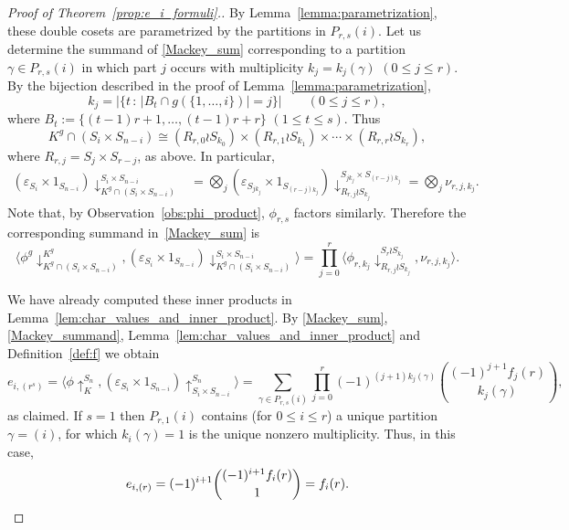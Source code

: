 \documentclass[10pt]{article}
\theoremstyle{definition}
\newcommand{\card}[1]{\ensuremath{\left|#1\right|}}
\begin{document}
\begin{proof}[Proof of  Theorem~\ref{prop:e_i_formuli}.]
    By Lemma~\ref{lemma:parametrization}, 
    these double cosets are parametrized by the partitions in $P_{r,s}(i)$.  Let us determine the summand of \eqref{Mackey_sum} 
    corresponding to a partition $\gamma\in P_{r,s}(i)$ in which part $j$ occurs with multiplicity $k_j = k_j(\gamma)$ $(0 \le j \le r)$. 
    By the bijection described in the proof of Lemma~\ref{lemma:parametrization}, 
    \[
        k_j = \card{\{t \,:\, \card{B_t \cap g(\{1, \ldots, i\})} = j\}}
        \qquad (0 \le j \le r),
    \]
    where $B_t := \{(t-1)r+1,\ldots,(t-1)r+r\}$ $(1 \le t \le s)$. Thus
    \[
        K^g \cap (S_i \times S_{n-i})
        \cong (R_{r,0} \wr S_{k_0}) \times (R_{r,1} \wr S_{k_1}) \times \cdots \times (R_{r,r}\wr S_{k_r}),
    \]
    where $R_{r,j} = S_j \times S_{r-j}$, as above. In particular,
    \begin{align*}
        (\varepsilon_{S_i} \times 1_{S_{n-i}})\downarrow^{S_i \times S_{n-i}}_{K^g \cap (S_i \times S_{n-i})}
        &= \bigotimes_j (\varepsilon_{S_{jk_j}} \times 1_{S_{(r-j)k_j}})\downarrow^{S_{jk_j} \times S_{(r-j)k_j}}_{R_{r,j}\wr S_{k_j}}
        = \bigotimes_j \nu_{r,j,k_j}.
    \end{align*}
    Note that, by Observation~\ref{obs:phi_product}, $\phi_{r,s}$ factors similarly.
    Therefore the corresponding summand in~\eqref{Mackey_sum} is
    \begin{equation}\label{Mackey_summand}
        \langle \phi^g\downarrow^{K^g}_{K^g \cap (S_i \times S_{n-i})},
        (\varepsilon_{S_i} \times 1_{S_{n-i}})\downarrow^{S_i \times S_{n-i}}_{K^g \cap (S_i \times S_{n-i})} \rangle 
        = \prod_{j=0}^{r} \langle \phi_{r,k_j}\downarrow^{S_r\wr S_{k_j}}_{R_{r,j}\wr S_{k_j}}, \nu_{r,j,k_j} \rangle.
    \end{equation}
		
    We have already computed these inner products in Lemma~\ref{lem:char_values_and_inner_product}.
    By \eqref{Mackey_sum}, \eqref{Mackey_summand}, Lemma~\ref{lem:char_values_and_inner_product}
    and Definition~\ref{def:f} we obtain
    \[
        e_{i,(r^s)} 
        = \langle \phi\uparrow_K^{S_n}, (\varepsilon_{S_i} \times 1_{S_{n-i}})\uparrow_{S_i \times S_{n-i}}^{S_n} \rangle
        = \sum_{\gamma\in P_{r,s}(i)} \prod_{j=0}^{r} 
        (-1)^{(j+1)k_j(\gamma)} \binom{(-1)^{j+1} f_j(r)}{k_j(\gamma)},
    \]
    as claimed.
    If $s=1$ then $P_{r,1}(i)$ contains (for $0 \le i \le r$) 
    a unique partition $\gamma = (i)$, for which $k_i(\gamma) = 1$ is the unique nonzero multiplicity. Thus, in this case,  
    \[
        e_{i,(r)} 
        = (-1)^{i+1} \binom{(-1)^{i+1}f_i(r)}{1} 
        = f_i(r).
        \qedhere
    \]
\end{proof}
 
\end{document}
